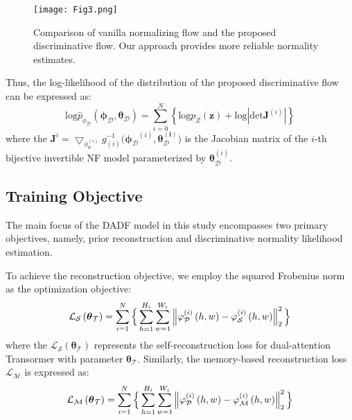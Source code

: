 \documentclass[journal]{IEEEtran}
\begin{document}
\begin{figure}[t]
\centerline{\texttt{[image: Fig3.png]}}
\caption[width=8.8cm]{
Comparison of vanilla normalizing flow and the proposed discriminative flow. Our approach provides more reliable normality estimates. }
\label{fig1}
\end{figure}

Thus, the log-likelihood of the distribution of the proposed discriminative flow can be expressed as:
\begin{equation}
\mathrm{log} \hat{p}_{\phi_{\mathcal{D} }} \left ( \boldsymbol{\phi_{\mathcal{D}}}, \boldsymbol{\theta _{\mathcal{D}}} \right )  = \sum_{i=0}^{N}\left \{ \mathrm{log}p_{Z}\left ( \boldsymbol{z} \right )+ \mathrm{log}\left | \mathrm{det}\boldsymbol{J}^{(i)}  \right | \right \}
\end{equation}
where the $\boldsymbol{J}^{i} = \bigtriangledown _{\phi_{d}^{(i)}}g^{-1}_{(i)}\big (  \boldsymbol{\phi_{\mathcal{D}}}^{(i)}, \boldsymbol{\theta_{\mathcal{D}}^{(i)} }\big ) $ is the Jacobian matrix of the 
$i$-th bijective invertible NF model parameterized by $\boldsymbol{\theta}_{\mathcal{D}}^{(i)}$. 



\subsection{Training Objective}
The main focus of the DADF model in this study encompasses two primary objectives, namely, prior reconstruction and discriminative normality likelihood estimation. 

To achieve the reconstruction objective, we employ the squared Frobenius norm as the optimization objective:
\begin{equation}
\mathcal{L}_{\mathcal{S}}\left (  \boldsymbol{\theta }_{\mathcal{T} } \right ) = \sum_{i=1}^{N}\Big\{   \sum_{h=1}^{H_{i}}  \sum_{w=1}^{W_{i}} \left \|  {\large\varphi_{\mathcal{P}}^{(i)}} \left ( h,w \right) -{\large\varphi_{\mathcal{S}}^{(i)}} \left ( h,w \right)  \right \|_{2}^{2} \Big\}
\end{equation}
where the $\mathcal{L}_{\mathcal{S}}\left (  \boldsymbol{\theta }_{\mathcal{T} } \right )$ represents the self-reconstruction loss for dual-attention Transormer with parameter $ \boldsymbol{\theta }_{\mathcal{T}}$. Similarly, the memory-based reconstruction loss $ \mathcal{L}_{\mathcal{M}}$ is expressed as:
\begin{equation}
\mathcal{L}_{\mathcal{M}}\left (  \boldsymbol{\theta }_{\mathcal{T} } \right ) = \sum_{i=1}^{N}\Big\{   \sum_{h=1}^{H_{i}}  \sum_{w=1}^{W_{i}} \left \|  {\large\varphi_{\mathcal{P}}^{(i)}} \left ( h,w \right) -{\large\varphi_{\mathcal{M}}^{(i)}} \left ( h,w \right)  \right \|_{2}^{2} \Big\}
\end{equation}
\end{document}
